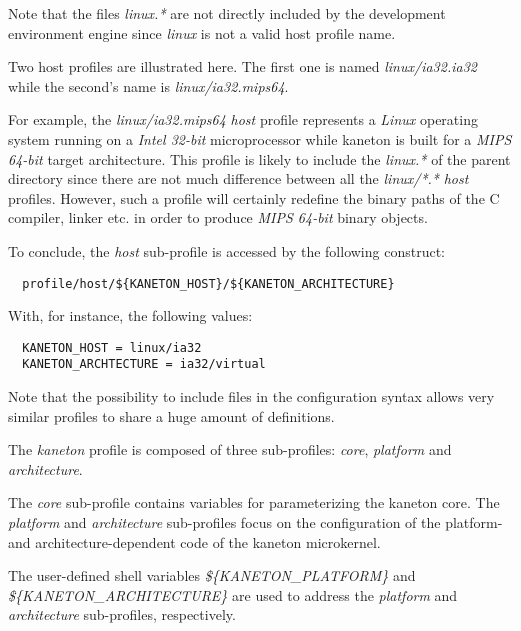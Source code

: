 Note that the files \textit{linux.*} are not directly included by the
development environment engine since \textit{linux} is not a valid host
profile name.

Two host profiles are illustrated here. The first one is named
\textit{linux/ia32.ia32} while the second's name is \textit{linux/ia32.mips64}.

For example, the \textit{linux/ia32.mips64} \textit{host} profile represents a
\textit{Linux} operating system running on a \textit{Intel 32-bit}
microprocessor while kaneton is built for a \textit{MIPS 64-bit} target
architecture. This profile is likely to include the \textit{linux.*} of the
parent directory since there are not much difference between all the
\textit{linux/*.*} \textit{host} profiles. However, such a profile will
certainly redefine the binary paths of the C compiler, linker etc. in order
to produce \textit{MIPS 64-bit} binary objects.

To conclude, the \textit{host} sub-profile is accessed by the following
construct:

\begin{verbatim}
  profile/host/${KANETON_HOST}/${KANETON_ARCHITECTURE}
\end{verbatim}

With, for instance, the following values:

\begin{verbatim}
  KANETON_HOST = linux/ia32
  KANETON_ARCHTECTURE = ia32/virtual
\end{verbatim}

Note that the possibility to include files in the configuration syntax allows
very similar profiles to share a huge amount of definitions.



The \textit{kaneton} profile is composed of three sub-profiles: \textit{core},
\textit{platform} and \textit{architecture}.

The \textit{core} sub-profile contains variables for parameterizing the
kaneton core. The \textit{platform} and \textit{architecture} sub-profiles
focus on the configuration of the platform- and architecture-dependent code
of the kaneton microkernel.

The user-defined shell variables \textit{\$\{KANETON\_PLATFORM\}} and
\textit{\$\{KANETON\_ARCHITECTURE\}} are used to address the \textit{platform}
and \textit{architecture} sub-profiles, respectively.

